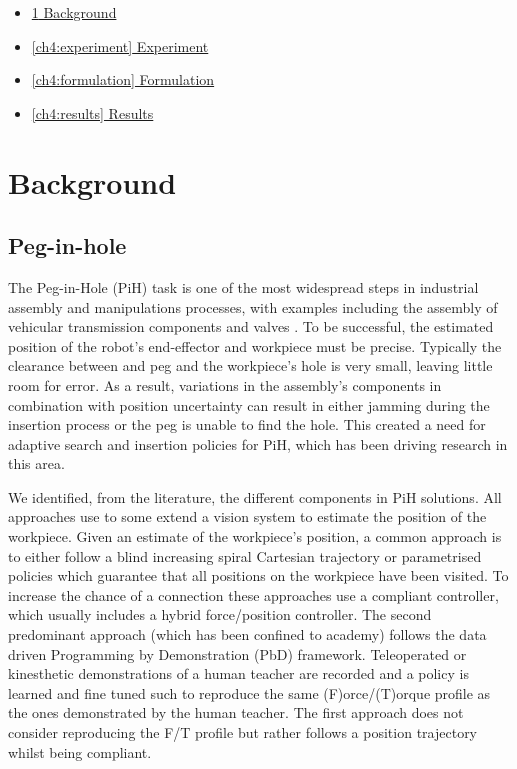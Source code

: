 \begin{itemize}
  \item \hyperref[ch4:background]{\ref{ch4:background}   Background}
  \item \hyperref[ch4:experiment]{\ref{ch4:experiment}   Experiment}
  \item \hyperref[ch4:formulation]{\ref{ch4:formulation} Formulation}
  \item \hyperref[ch4:results]{\ref{ch4:results}  	 Results}
\end{itemize}

\section{Background}\label{ch4:background}

\subsection{Peg-in-hole}

The Peg-in-Hole (PiH) task is one of the most widespread steps in industrial assembly and manipulations processes, with 
examples including the assembly of vehicular transmission components \cite{search_strategies_icra_2001} and 
valves \cite{online_gpr_icra_2014}. To be successful, the estimated
position of the robot's end-effector and workpiece must be precise. Typically the clearance between and peg and the workpiece's hole is very small, leaving 
little room for error. As a result, variations in the assembly's components in combination with position uncertainty 
can result in either jamming during the insertion process or the peg is unable to find the hole. This 
created a need for adaptive search and insertion policies for PiH, which has been driving research 
in this area. 

We identified, from the literature, the different components in PiH solutions. All approaches
use to some extend a vision system to estimate the position of the workpiece. Given an estimate of the workpiece's position, 
a common approach is to either follow a blind increasing spiral Cartesian trajectory or parametrised policies 
which guarantee that all positions on the workpiece have been visited. To 
increase the chance of a connection these approaches use a compliant controller, 
which usually includes a hybrid force/position controller.
The second predominant approach (which has been confined to academy) follows the data driven Programming by Demonstration (PbD) 
framework. Teleoperated or kinesthetic demonstrations of a human teacher are recorded and a policy is learned and fine tuned 
such to reproduce the same (F)orce/(T)orque profile as the ones demonstrated by the human teacher. The first approach 
does not consider reproducing the F/T profile but rather follows a position trajectory whilst being compliant.


